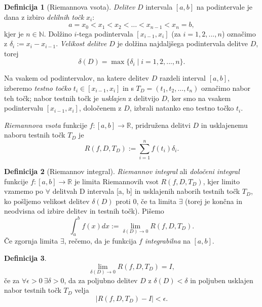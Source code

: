 \documentclass[11pt]{article}
\theoremstyle{definition}
\newtheorem{definicija}{Definicija}[section]
\begin{document}
\begin{definicija}[Riemannova vsota]

\textit{Delitev} $D$ intervala $[a, b]$ na podintervale je dana z izbiro \textit{delilnih točk} $x_i$:
$$a=x_0 < x_1 < x_2 < \dots < x_{n-1} < x_n=b,$$
kjer je $n \in \mathbb{N}$. Dolžino $i$-tega podintervala $[x_{i-1},x_i]$ (za $i=1,2,...,n$) označimo z $\delta_i := x_i - x_{i-1}$. \textit{Velikost delitve} $D$ je dolžina najdaljšega podintervala delitve $D$, torej
$$\delta(D) = \max{\{\delta_i \mid i = 1, 2, ..., n\}}.$$

Na vsakem od podintervalov, na katere delitev $D$ razdeli interval $[a, b]$, izberemo \textit{testno točko} $t_i \in [x_{i-1}, x_i]$ in s $T_D = (t_1, t_2, \dots, t_n)$ označimo nabor teh točk; nabor testnih točk je \textit{usklajen} z delitvijo $D$, ker smo na vsakem podintervalu $[x_{i-1},x_i]$, določenem z $D$, izbrali natanko eno testno točko $t_i$.

\textit{Riemannova vsota} funkcije $f:[a, b] \rightarrow \mathbb{R}$, pridružena delitvi $D$ in usklajenemu naboru testnih točk $T_D$ je 
$$R(f, D, T_D) := \sum_{i=1}^{n} f(t_i) \delta_i.$$

\end{definicija}
\vspace{0.5cm}

\begin{definicija}[Riemannov integral]

\textit{Riemannov integral} ali \textit{določeni integral} funkcije $f:[a, b] \rightarrow \mathbb{R}$ je limita Riemannovih vsot $R(f, D, T_D)$, kjer limito vzamemo po $\forall$ delitvah D intervala [a, b] in usklajenih naborih testnih točk $T_D$, ko pošljemo velikost delitev $\delta(D)$ proti $0$, če ta limita $\exists$ (torej je končna in neodvisna od izbire delitev in testnih točk). Pišemo
$$\int_{a}^{b} f(x) dx := \lim_{\delta(D) \rightarrow 0} R(f, D, T_D).$$
Če zgornja limita $\exists$, rečemo, da je funkcija $f$ \textit{integrabilna} na $[a, b]$.

\end{definicija}
\vspace{0.5cm}

\begin{definicija}

$$\lim_{\delta(D) \rightarrow 0} R(f, D, T_D) = I,$$
če za $\forall \epsilon > 0 ~ \exists \delta > 0$, da za poljubno delitev $D$ z $\delta(D) < \delta$ in poljuben usklajen nabor testnih točk $T_D$ velja
$$|R(f, D, T_D) - I| < \epsilon.$$ 

\end{definicija}
\vspace{0.5cm}
\end{document}
